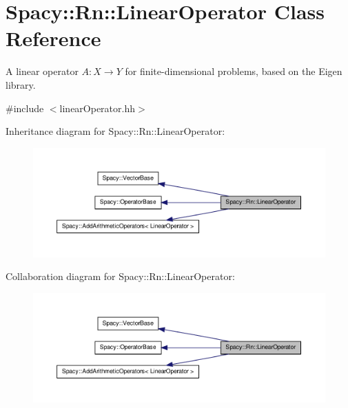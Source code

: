 \hypertarget{classSpacy_1_1Rn_1_1LinearOperator}{\section{\-Spacy\-:\-:\-Rn\-:\-:\-Linear\-Operator \-Class \-Reference}
\label{classSpacy_1_1Rn_1_1LinearOperator}
}


\-A linear operator $A:X\rightarrow Y$ for finite-\/dimensional problems, based on the \-Eigen library.  




{\ttfamily \#include $<$linear\-Operator.\-hh$>$}



\-Inheritance diagram for \-Spacy\-:\-:\-Rn\-:\-:\-Linear\-Operator\-:
\nopagebreak
\begin{figure}[H]
\begin{center}
\leavevmode
\includegraphics[width=350pt]{classSpacy_1_1Rn_1_1LinearOperator__inherit__graph}
\end{center}
\end{figure}


\-Collaboration diagram for \-Spacy\-:\-:\-Rn\-:\-:\-Linear\-Operator\-:
\nopagebreak
\begin{figure}[H]
\begin{center}
\leavevmode
\includegraphics[width=350pt]{classSpacy_1_1Rn_1_1LinearOperator__coll__graph}
\end{center}
\end{figure}
